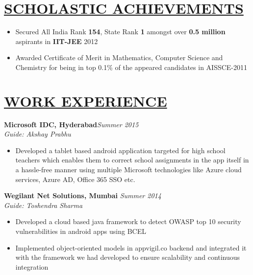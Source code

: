 \documentclass[11pt]{res}
\begin{document}
\thispagestyle{empty} %
\begin{resume}
\vspace{5ex}

\section{\underline{SCHOLASTIC ACHIEVEMENTS}}
\vspace{3pt}
\begin{itemize} \itemsep -2pt
\item Secured All India Rank \textbf{154}, State Rank \textbf{1} amongst over \textbf{0.5 million} aspirants in \textbf{IIT-JEE} 2012 
\item Awarded Certificate of Merit in Mathematics, Computer Science and Chemistry for being in top 0.1\% of the appeared candidates in AISSCE-2011
\end{itemize}

\vspace{-20pt}
\section{\underline{WORK EXPERIENCE}} 
\vspace{3pt}
\textbf{Microsoft IDC, Hyderabad}\hfill \emph{Summer 2015}\\
\textsl{Guide: Akshay Prabhu} \hfill  
\begin{itemize} \itemsep -2pt %
   \item Developed a tablet based android application targeted for high school teachers which enables them to correct school assignments in the app itself in a hassle-free manner using multiple Microsoft technologies like Azure cloud services, Azure AD, Office 365 SSO etc.
\end{itemize}

\vspace{-10pt}
\textbf{Wegilant Net Solutions, Mumbai} \hfill \emph{Summer 2014}\\
\textsl{Guide: Toshendra Sharma} \hfill  
 \begin{itemize} \itemsep -2pt
\item Developed a cloud based java framework to detect OWASP top 10 security vulnerabilities in android apps using BCEL
\item Implemented object-oriented models in appvigil.co backend and integrated it with the framework we had developed to ensure scalability and continuous integration 
\end{itemize}


\end{resume}
\end{document}
